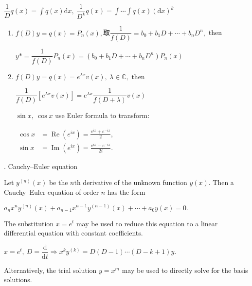 \documentclass[UTF8]{ctexart}
\numberwithin{equation}{section}
\numberwithin{figure}{section}
\numberwithin{table}{section}
\newcommand\dif{\mathrm{d}}
\newcommand\no{\noindent}
\newcommand\dis{\displaystyle}
\newcommand\intd{\dis\int}
\begin{document}
\begin{spacing}{2}
\vspace{0.2cm}

\centerline{$\dfrac{1}{D}q(x)=\intd q(x)\dif x,\ 
\dfrac{1}{D^k}q(x)=\intd\cdots\intd q(x)(\dif x)^k$}

\begin{enumerate}[itemindent=1.4em, label=(\arabic*)]

\item $f(D)y=q(x)=P_n(x),$取$\dfrac{1}{f(D)}=b_0+b_1D+\cdots+b_nD^n,$ then

\vspace{0.2cm}

\centerline{$y*=\dfrac{1}{f(D)}P_n(x)=(b_0+b_1D+\cdots+b_nD^n)P_n(x)$}

\item $f(D)y=q(x)=e^{\lambda x}v(x),\ \lambda\in\mathbb{C},$ then

\vspace{0.2cm}

\centerline{$\dfrac{1}{f(D)}\left[e^{\lambda x}v(x)\right]=e^{\lambda x}\dfrac{1}{f(D+\lambda)}v(x)$}

$\sin x,\ \cos x$ use Euler formula to transform:

\vspace{0.2cm}

\centerline{${\displaystyle {\begin{aligned}\cos x&=\operatorname {Re} \left(e^{ix}\right)={\frac {e^{ix}+e^{-ix}}{2}},\\\sin x&=\operatorname {Im} \left(e^{ix}\right)={\frac {e^{ix}-e^{-ix}}{2i}}.\end{aligned}}}$}

\end{enumerate}

\no6. Cauchy–Euler equation

Let $y^{(n)}(x)$ be the $n$th derivative of the unknown function $y(x)$. Then a Cauchy–Euler equation of order $n$ has the form

\centerline{\textcolor[rgb]{0,0,1}{$a_{{n}}x^{n}y^{{(n)}}(x)+a_{{n-1}}x^{{n-1}}y^{{(n-1)}}(x)+\cdots +a_{0}y(x)=0.$}}

The substitution ${\displaystyle x=e^{t}}$ may be used to reduce this equation to a linear differential equation with constant coefficients. 

\centerline{\textcolor[rgb]{0,0,1}{$x=e^t,\ D=\dfrac{\dif}{\dif t}
\Longrightarrow x^ky^{(k)}=D(D-1)\cdots(D-k+1)y.$}}

Alternatively, the trial solution ${\displaystyle y=x^{m}}$ may be used to directly solve for the basis solutions.


\end{spacing}
\end{document}

